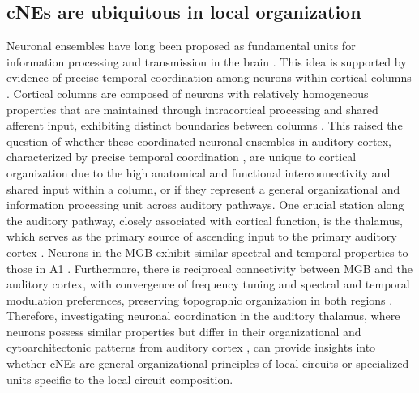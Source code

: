 \documentclass[11pt]{article}
\begin{document}
\subsection*{cNEs are ubiquitous in local organization}
Neuronal ensembles have long been proposed as fundamental units for information processing and transmission in the brain \citep{Buzsaki2010, hebb1949organization}. This idea is supported by evidence of precise temporal coordination among neurons within cortical columns \citep{atencio2013auditory, lankarany2019, See2018}. Cortical columns are composed of neurons with relatively homogeneous properties that are maintained through intracortical processing and shared afferent input, exhibiting distinct boundaries between columns \citep{mountcastle1997columnar}. This raised the question of whether these coordinated neuronal ensembles in auditory cortex, characterized by precise temporal coordination \citep{See2018}, are unique to cortical organization due to the high anatomical and functional interconnectivity and shared input within a column, or if they represent a general organizational and information processing unit across auditory pathways. One crucial station along the auditory pathway, closely associated with cortical function, is the thalamus, which serves as the primary source of ascending input to the primary auditory cortex \citep{smith2012thalamocortical, winer2005auditory}. Neurons in the MGB exhibit similar spectral and temporal properties to those in A1 \citep{Miller2002, bartlett2007neural}. Furthermore, there is reciprocal connectivity between MGB and the auditory cortex, with convergence of frequency tuning and spectral and temporal modulation preferences, preserving topographic organization in both regions \citep{read2011distinct, miller2001functional}. Therefore, investigating neuronal coordination in the auditory thalamus, where neurons possess similar properties but differ in their organizational and cytoarchitectonic patterns from auditory cortex \citep{winer2010neurochemical}, can provide insights into whether cNEs are general organizational principles of local circuits or specialized units specific to the local circuit composition.
\end{document}
